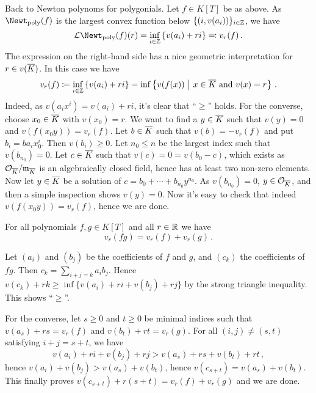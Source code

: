 \documentclass[a4paper, 10pt, oneside, DIV=9, chapterprefix=true, numbers=enddot,bibliography=totoc]{scrbook}
\begin{document}
Back to Newton polynoms for polygonials. Let $f\in K[T]$ be as above. As $\Newt_\poly(f)$ is the largest convex function below $\{(i,v(a_i))\}_{i\in \mathbb{Z}}$, we have
\begin{equation*}
	\Ll\Newt_\poly(f)(r)=\inff_{i\in\IZ}\left\{v(a_i)+ri\right\}\eqqcolon v_r(f)\,.
\end{equation*}
The expression on the right-hand side has a nice geometric interpretation for $r\in v(\ov{K})$. In this case we have
\begin{equation*}
	v_r(f)\coloneqq \inff_{i\in\IZ}\left\{v(a_i)+ri\right\}=\inff\left\{v(f(x))\st x\in\ov{K}\text{ and }v(x)=r\right\}\,.
\end{equation*}
Indeed, as $v(a_ix^i)=v(a_i)+ri$, it's clear that \enquote{$\geq $} holds. For the converse, choose $x_0\in\ov{K}$ with $v(x_0)=r$. We want to find a $y\in\ov{K}$ such that $v(y)=0$ and $v(f(x_0y))=v_r(f)$. Let $b\in \ov{K}$ such that $v(b)=-v_r(f)$ and put $b_i=ba_ix_0^i$. Then $v(b_i)\geq 0$. Let $n_0\leq n$ be the largest index such that $v(b_{n_0})=0$. Let $c\in\ov{K}$ such that $v(c)=0=v(b_0-c)$, which exists as $\Oo_{\ov{K}}/\mm_{\ov{K}}$ is an algebraically closed field, hence has at least two non-zero elements. Now let $y\in\ov{K}$ be a solution of $c=b_0+\dotsb+b_{n_0}y^{n_0}$. As $v(b_{n_0})=0$, $y\in\Oo_{\ov{K}}$, and then a simple inspection shows $v(y)=0$. Now it's easy to check that indeed $v(f(x_0y))=v_r(f)$, hence we are done. 
\begin{exc}\label{exc:vrOfProduct}
	For all polynomials $f,g\in K[T]$ and all $r\in\mathbb{R}$ we have 
	\begin{equation*}
		v_r(fg)=v_r(f)+v_r(g)\,.
	\end{equation*}
\end{exc}
\begin{proof*}
	Let $(a_i)$ and $(b_j)$ be the coefficients of $f$ and $g$, and $(c_k)$ the coefficients of $fg$. Then $c_k=\sum_{i+j=k}a_ib_j$. Hence $v(c_k)+rk\geq \inf\{v(a_i)+ri+v(b_j)+rj\}$ by the strong triangle inequality. This shows \enquote{$\geq$}. 
	
	For the converse, let $s\geq 0$ and $t\geq 0$ be minimal indices such that $v(a_s)+rs=v_r(f)$ and $v(b_t)+rt=v_r(g)$. For all $(i,j)\neq (s,t)$ satisfying $i+j=s+t$, we have 
	\begin{equation*}
		v(a_i)+ri+v(b_j)+rj>v(a_s)+rs+v(b_t)+rt\,,
	\end{equation*}
	hence $v(a_i)+v(b_j)>v(a_s)+v(b_t)$, hence $v(c_{s+t})=v(a_s)+v(b_t)$. This finally proves $v(c_{s+t})+r(s+t)=v_r(f)+v_r(g)$ and we are done.
\end{proof*}
\end{document}
